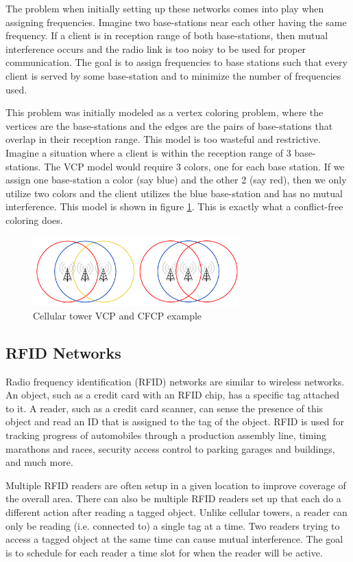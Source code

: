 \documentclass{sig-alternate}
\begin{document}
The problem when initially setting up these networks comes into play when assigning frequencies. Imagine two base-stations near each other having the same frequency. If a client is in reception range of both base-stations, then mutual interference occurs and the radio link is too noisy to be used for proper communication. The goal is to assign frequencies to base stations such that every client is served by some base-station and to minimize the number of frequencies used.

This problem was initially modeled as a vertex coloring problem, where the vertices are the base-stations and the edges are the pairs of base-stations that overlap in their reception range. This model is too wasteful and restrictive. Imagine a situation where a client is within the reception range of 3 base-stations. The VCP model would require 3 colors, one for each base station. If we assign one base-station a color (say blue) and the other 2 (say red), then we only utilize two colors and the client utilizes the blue base-station and has no mutual interference. This model is shown in figure \ref{fig:towers}. This is exactly what a conflict-free coloring does. \cite{smorodinsky2013conflict}

\begin{figure}[h]
	\centering
	\includegraphics[width=8cm,trim=4 4 4 4,clip]{../figures/towers.pdf}
	\caption{Cellular tower VCP and CFCP example}\label{fig:towers}
\end{figure}

\subsection{RFID Networks}
Radio frequency identification (RFID) networks are similar to wireless networks. An object, such as a credit card with an RFID chip, has a specific tag attached to it. A reader, such as a credit card scanner, can sense the presence of this object and read an ID that is assigned to the tag of the object. RFID is used for tracking progress of automobiles through a production assembly line, timing marathons and races, security access control to parking garages and buildings, and much more.

Multiple RFID readers are often setup in a given location to improve coverage of the overall area. There can also be multiple RFID readers set up that each do a different action after reading a tagged object. Unlike cellular towers, a reader can only be reading (i.e. connected to) a single tag at a time. Two readers trying to access a tagged object at the same time can cause mutual interference. The goal is to schedule for each reader a time slot for when the reader will be active.
\end{document}
